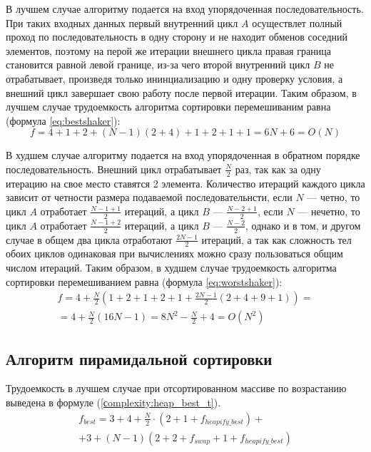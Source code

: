 В лучшем случае алгоритму подается на вход упорядоченная последовательность.
При таких входных данных первый внутренний цикл $A$ осуществлет полный проход
по последовательность в одну сторону и не находит обменов соседний элементов,
поэтому на перой же итерации внешнего цикла правая граница становится равной
левой границе, из-за чего второй внутренний цикл $B$ не отрабатывает, произведя
только ининциализацию и одну проверку условия, а внешний цикл завершает свою
работу после первой итерации. Таким образом, в лучшем случае трудоемкость
алгоритма сортировки перемешиваним равна (формула \ref{eq:bestshaker}):
\begin{equation}\label{eq:bestshaker}
    f = 4 + 1 + 2 + (N - 1)(2 + 4) + 1 + 2 + 1 + 1 =
                    6N + 6 = O(N)
\end{equation}

В худшем случае алгоритму подается на вход упорядоченная в обратном порядке
последовательность. Внешний цикл отрабатывает $\frac{N}{2}$ раз, так как за
одну итерацию на свое место ставятся 2 элемента. Количество итераций каждого
цикла зависит от четности размера подаваемой последовательнсти, если $N$ ---
четно, то цикл $A$ отработает $\frac{N - 1 + 1}{2}$ итераций, а цикл $B$ ---
$\frac{N - 2 + 1}{2}$, если $N$ --- нечетно, то цикл $A$ отработает $\frac{N -
1 + 2}{2}$ итераций, а цикл $B$ --- $\frac{N - 2}{2}$, однако и в том, и другом
случае в общем два цикла отработают $\frac{2N-1}{2}$ итераций, а так как
сложность тел обоих циклов одинаковая при вычислениях можно сразу пользоваться
общим числом итераций. Таким образом, в худшем случае трудоемкость алгоритма
сортировки перемешиванием равна (формула \ref{eq:worstshaker}):
\begin{multline}\label{eq:worstshaker}
    f = 4 + \frac{N}{2}(1 + 2 + 1 + 2 + 1 + \frac{2N-1}{2}(2 + 4 + 9
                + 1)) =\\= 4 + \frac{N}{2}(16N - 1) = 8N^2-\frac{N}{2} + 4 =
                O(N^2)
\end{multline}

\subsection{Алгоритм пирамидальной сортировки}

Трудоемкость в лучшем случае при отсортированном массиве по возрастанию выведена в формуле (\ref{сomplexity:heap_best_t}).
\begin{equation}
	\label{сomplexity:heap_best_t}
	\begin{gathered}
		f_{best} = 3 + 4 + \frac{N}{2} \cdot (2 + 1 + f_{heapify\_best}) + \\
		+ 3 + (N - 1)(2 + 2 + f_{swap} + 1 + f_{heapify\_best})
	\end{gathered}
\end{equation}

